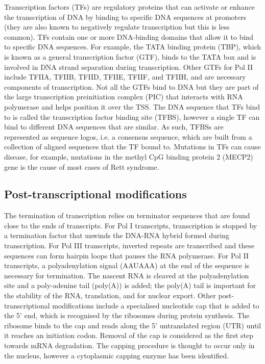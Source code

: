 Transcription factors (TFs) are regulatory proteins that can activate or enhance the transcription of DNA by binding to specific DNA sequences at promoters (they are also known to negatively regulate transcription but this is less common)\cite{pmid11092823}. TFs contain one or more DNA-binding domains that allow it to bind to specific DNA sequences. For example, the TATA binding protein (TBP), which is known as a general transcription factor (GTF), binds to the TATA box and is involved in DNA strand separation during transcription. Other GTFs for Pol II include TFIIA, TFIIB, TFIID, TFIIE, TFIIF, and TFIIH, and are necessary components of transcription. Not all the GTFs bind to DNA but they are part of the large transcription preinitiation complex (PIC) that interacts with RNA polymerase and helps position it over the TSS. The DNA sequence that TFs bind to is called the transcription factor binding site (TFBS), however a single TF can bind to different DNA sequences that are similar. As such, TFBSs are represented as sequence logos, i.e. a consensus sequence, which are built from a collection of aligned sequences that the TF bound to. Mutations in TFs can cause disease, for example, mutations in the methyl CpG binding protein 2 (MECP2) gene is the cause of most cases of Rett syndrome.

\subsection{Post-transcriptional modifications}

The termination of transcription relies on terminator sequences that are found close to the ends of transcripts. For Pol I transcripts, transcription is stopped by a termination factor that unwinds the DNA-RNA hybrid formed during transcription. For Pol III transcripts, inverted repeats are transcribed and these sequences can form hairpin loops that pauses the RNA polymerase. For Pol II transcripts, a polyadenylation signal (AAUAAA) at the end of the sequence is necessary for termination\cite{pmid3479794}. The nascent RNA is cleaved at the polyadenylation site and a poly-adenine tail (poly(A)) is added; the poly(A) tail is important for the stability of the RNA, translation, and for nuclear export. Other post-transcriptional modifications include a specialised nucleotide cap that is added to the 5' end, which is recognised by the ribosomes during protein synthesis. The ribosome binds to the cap and reads along the 5' untranslated region (UTR) until it reaches an initiation codon. Removal of the cap is considered as the first step towards mRNA degradation. The capping procedure is thought to occur only in the nucleus, however a cytoplasmic capping enzyme has been identified\cite{pmid22921400}.

